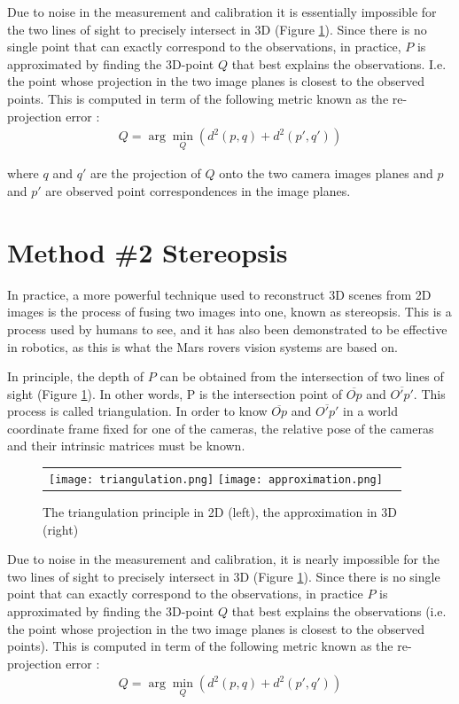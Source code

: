 \documentclass[twoside]{article}
\begin{document}
Due to noise in the measurement and calibration it is essentially impossible for the two lines of sight to precisely intersect in 3D (Figure \ref{triangle}). Since there is no single point that can exactly correspond to the observations, in practice, $P$ is approximated by finding the 3D-point $Q$ that best explains the observations. I.e. the point whose projection in the two image planes is closest to the observed points. This is computed in term of the following metric known as the re-projection error :
\begin{align}
Q = \arg\!\min_Q (d^2(p, q) + d^2(p', q'))
\end{align}

where $q$ and $q'$ are the projection of $Q$ onto the two camera images planes and $p$ and $p'$ are observed point correspondences in the image planes.
\section{Method \#2 Stereopsis}

In practice, a more powerful technique used to reconstruct 3D scenes from 2D images is the process of fusing two images into one, known as stereopsis. This is a process used by humans to see, and it has also been demonstrated to be effective in robotics, as this is what the Mars rovers vision systems are based on.

In principle, the depth of $P$ can be obtained from the intersection of two lines of sight (Figure \ref{triangle}). In other words, P is the intersection point of $\overline{Op}$ and $\overline{O'p'}$. This process is called triangulation. In order to know $\overline{Op}$ and $\overline{O'p'}$ in a  world coordinate frame fixed for one of the cameras, the relative pose of the cameras and their intrinsic matrices must be known.

\begin{figure}[h!]
  \begin{center}
	\begin{tabular}{cc}
	  \texttt{[image: triangulation.png]}
	  \texttt{[image: approximation.png]}
	\end{tabular}
  \end{center}
  \caption{The triangulation principle in 2D (left), the approximation in 3D (right)}
  \label{triangle}
\end{figure}

Due to noise in the measurement and calibration, it is nearly impossible for the two lines of sight to precisely intersect in 3D (Figure \ref{triangle}). Since there is no single point that can exactly correspond to the observations, in practice $P$ is approximated by finding the 3D-point $Q$ that best explains the observations (i.e. the point whose projection in the two image planes is closest to the observed points). This is computed in term of the following metric known as the re-projection error :
\begin{align}
Q = \arg\!\min_Q (d^2(p, q) + d^2(p', q'))
\end{align}
\end{document}

